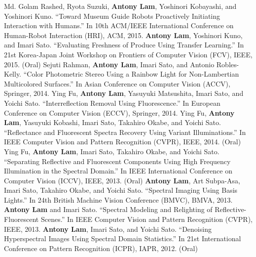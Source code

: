 \documentclass[letterpaper,10pt]{article}
\begin{document}
Md. Golam Rashed, Ryota Suzuki, \textbf{Antony Lam}, Yoshinori Kobayashi, and Yoshinori Kuno. ``Toward Museum Guide Robots Proactively Initiating Interaction with Humans.'' In 10th ACM/IEEE International Conference on Human-Robot Interaction (HRI), ACM, 2015.\vspace{0.05in}\newline
\textbf{Antony Lam}, Yoshinori Kuno, and Imari Sato. ``Evaluating Freshness of Produce Using Transfer Learning.'' In  21st Korea-Japan Joint Workshop on Frontiers of Computer Vision (FCV), IEEE, 2015. (Oral)
\vspace{0.05in}\newline
Sejuti Rahman, \textbf{Antony Lam}, Imari Sato, and Antonio Robles-Kelly. ``Color Photometric Stereo Using a Rainbow Light for Non-Lambertian Multicolored Surfaces.'' In Asian Conference on Computer Vision (ACCV), Springer, 2014.
\vspace{0.05in}\newline
Ying Fu, \textbf{Antony Lam}, Yasuyuki Matsushita, Imari Sato, and Yoichi Sato. ``Interreflection Removal Using Fluorescence.'' In European Conference on Computer Vision (ECCV), Springer, 2014.
\vspace{0.05in}\newline
Ying Fu, \textbf{Antony Lam}, Yasuyuki Kobashi, Imari Sato, Takahiro Okabe, and Yoichi Sato. ``Reflectance and Fluorescent Spectra Recovery Using Variant Illuminations.'' In IEEE Computer Vision and Pattern Recognition (CVPR), IEEE, 2014. (Oral)
\vspace{0.05in}\newline
Ying Fu, \textbf{Antony Lam}, Imari Sato, Takahiro Okabe, and Yoichi Sato. ``Separating Reflective and Fluorescent Components Using High Frequency Illumination in the Spectral Domain.'' In IEEE International Conference on Computer Vision (ICCV), IEEE, 2013. (Oral)
\vspace{0.05in}\newline
\textbf{Antony Lam}, Art Subpa-Asa, Imari Sato, Takahiro Okabe, and Yoichi Sato. ``Spectral Imaging Using Basis Lights.'' In 24th British Machine Vision Conference (BMVC), BMVA, 2013.
\vspace{0.05in}\newline
\textbf{Antony Lam} and Imari Sato. ``Spectral Modeling and Relighting of Reflective-Fluorescent Scenes.'' In IEEE Computer Vision and Pattern Recognition (CVPR), IEEE, 2013.
\vspace{0.05in}\newline
\textbf{Antony Lam}, Imari Sato, and Yoichi Sato. ``Denoising Hyperspectral Images Using Spectral Domain Statistics.'' In 21st International Conference on Pattern Recognition (ICPR), IAPR, 2012. (Oral)
\end{document}
